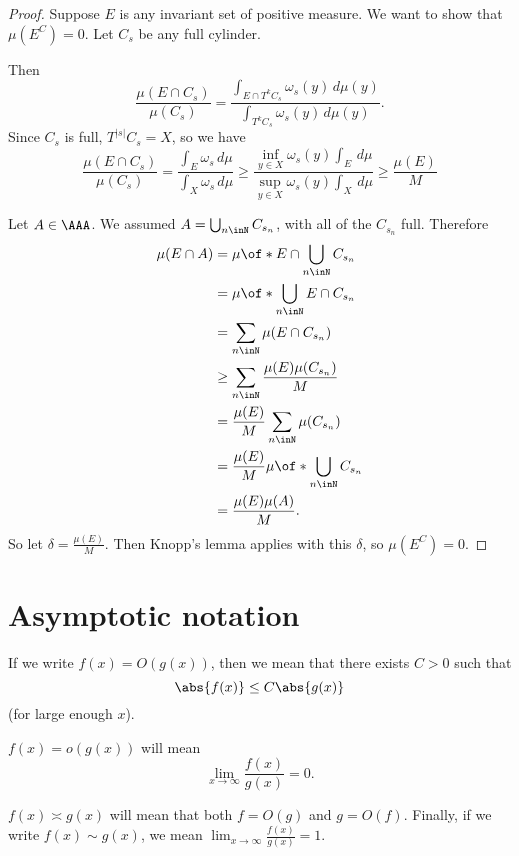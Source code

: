 \documentclass{article}
\begin{document}
\begin{proof}
    Suppose $E$ is any invariant set of positive 
    measure. We want to show that $\mu(E^C)=0$.
    Let $C_s$ be any full cylinder.

    Then 
    \[
        \frac{\mu(E\cap C_s)}{\mu(C_s)} 
        =
        \frac{
            \int_{E\cap T^kC_s} \omega_s(y)\,d\mu(y)
        }{
            \int_{T^kC_s} \omega_s(y)\,d\mu(y)
        }.
        \]
    Since $C_s$ is full, $T^{|s|}C_s = X$, so we 
    have 
    \[
        \frac{\mu(E\cap C_s)}{\mu(C_s)} 
        =
        \frac{\int_E\omega_s \,d\mu}{
            \int_X\omega_s\,d\mu
        }
        \ge \frac{\inf_{y\in X} \omega_s(y)\int_E\,d\mu}{
            \sup_{y\in X}\omega_s(y)\int_X\,d\mu
        }
        \ge \frac{\mu(E)}{M}
    \]

    Let $A\in \AAA$. We assumed $A=\bigcup_{n\inN} C_{s_n}$,
    with all of the $C_{s_n}$ full. Therefore
    \begin{align*}
        \mu(E\cap A) &=
        \mu\of*{E\cap \bigcup_{n\inN}C_{s_n}}
        \\
        &=
        \mu\of*{\bigcup_{n\inN}E\cap C_{s_n}}
        \\
        &=
        \sum_{n\inN}\mu(E\cap C_{s_n})
        \\
        &\ge \sum_{n\inN} \frac{\mu(E)\mu(C_{s_n})}{M}
        \\
        &=\frac{\mu(E)}{M}\sum_{n\inN}\mu(C_{s_n})
        \\
        &= \frac{\mu(E)}{M}\mu\of*{\bigcup_{n\inN}C_{s_n}}
        \\
        &=
        \frac{\mu(E)\mu(A)}{M}.
    \end{align*}
    So let $\delta = \frac{\mu(E)}{M}$. Then 
    Knopp's lemma applies with this $\delta$,
    so $\mu(E^C)=0$.
\end{proof}

\section{Asymptotic notation}

If we write $f(x) = O(g(x))$, then we mean 
that there exists $C>0$ such that 
\[\abs{f(x)} \le C\abs{g(x)} \]
(for large enough $x$).

$f(x) = o(g(x))$ will mean 
\[\lim_{x\to\infty} \frac{f(x)}{g(x)} = 0. \]

$f(x)\asymp g(x)$ will mean that 
both $f=O(g)$ and $g=O(f)$.
Finally, if we write 
$f(x)\sim g(x)$, we mean 
$\lim_{x\to\infty}\frac{f(x)}{g(x)}=1$.
\end{document}
